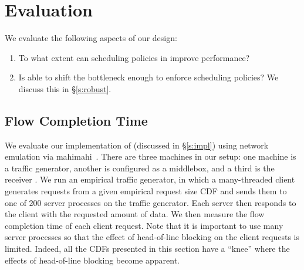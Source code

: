 \section{Evaluation}\label{s:eval}

We evaluate the following aspects of our design:
\begin{enumerate}
    \item To what extent can scheduling policies in \name improve performance?
    \item Is \name able to shift the bottleneck enough to enforce scheduling policies? We discuss this in \S\ref{s:robust}.
\end{enumerate}

\subsection{Flow Completion Time}\label{s:eval:fct}




We evaluate our implementation of \name (discussed in \S\ref{s:impl}) using network emulation via mahimahi~\cite{mahimahi}. 
There are three machines in our setup: one machine is a traffic generator, another is configured as a middlebox, and a third is the receiver .
We run an empirical traffic generator, in which a many-threaded client  generates requests from a given empirical request size CDF  and sends them to one of $200$ server processes on the traffic generator.
Each server then responds to the client with the requested amount of data.
We then measure the flow completion time of each client request.
Note that it is important to use many server processes so that the effect of head-of-line blocking on the client requests is limited.
Indeed, all the CDFs presented in this section have a ``knee'' where the effects of head-of-line blocking become apparent.


